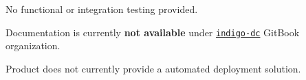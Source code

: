 \documentclass[a4wide,11pt]{article}
\begin{document}

\label{sec:func_int_test}

    No functional or integration testing provided.
    
    



\label{sec:gitbook}
Documentation is currently \textbf{not available} under \href{https://www.gitbook.com/@indigo-dc/dashboard}{\texttt{indigo-dc}} GitBook organization.



\label{sec:configuration}


Product does not currently provide a automated deployment solution.



\newpage

\end{document}
